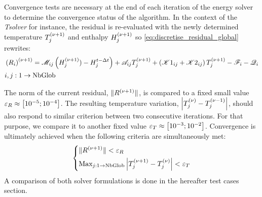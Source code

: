 Convergence tests are necessary at the end of each iteration of the energy solver to determine 
the convergence status of the algorithm. In the context of the \emph{Tsolver} for instance, the residual 
is re-evaluated with the newly determined temperature $\Tj^\iterplus$ and enthalpy $\Hj^\iterplus$ so \cref{eq:discretise_residual_global} rewrites:
\begin{align}
\begin{split}
\label{eq:discretise_residual_global_new}
& \brac{R_i}^\iterplus = \Mij \brac{\Hj^\iterplus) - \Hjtminus} + \Aij \Tj^\iterplus + \brac{\Kija + \Kijb}\Tj^\iterplus -\Fi - \Qi \\
& i,j:1 \rightarrow \text{NbGlob}
\end{split}
\end{align}

The norm of the current residual, $\norm{R^\iterplus}$, is compared to a fixed small 
value $\varepsilon_R \approx \crochet{\num{d-5};\num{d-4}}$. The resulting temperature variation, 
$\abval{\Tj^\iter-\Tj^\iterminus}$, should also respond to similar criterion between two consecutive 
iterations. For that purpose, we compare it to another fixed value $\varepsilon_T \approx \crochet{\num{d-3};\num{d-2}}$.
Convergence is ultimately achieved when the following criteria are simultaneously met:
\begin{equation}
\label{eq:energy_convergence_criteria}
   \left\{
   \begin{aligned}
      & \norm{R^\iterplus} < \varepsilon_R \\
	  & \text{Max}_{j:1 \rightarrow \text{NbGlob}} \abval{\Tj^\iterplus-\Tj^\iter} < \varepsilon_T
    \end{aligned}
    \right.
\end{equation}
A comparison of both solver formulations is done in the hereafter test cases section.


